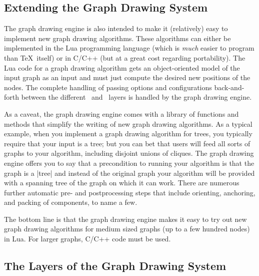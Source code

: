 \subsection{Extending the Graph Drawing System}

The graph drawing engine is also intended to make it (relatively) easy to
implement new graph drawing algorithms. These algorithms can either be
implemented in the Lua programming language (which is \emph{much} easier to
program than \TeX\ itself) or in C/C++ (but at a great cost regarding
portability). The Lua code for a graph drawing algorithm gets an
object-oriented model of the input graph as an input and must just compute the
desired new positions of the nodes. The complete handling of passing options
and configurations back-and-forth between the different \tikzname\ and
\pgfname\ layers is handled by the graph drawing engine.

As a caveat, the graph drawing engine comes with a library of functions and
methods that simplify the writing of new graph drawing algorithms. As a typical
example, when you implement a graph drawing algorithm for trees, you typically
require that your input is a tree; but you can bet that users will feed all
sorts of graphs to your algorithm, including disjoint unions of cliques. The
graph drawing engine offers you to say that a precondition to running your
algorithm is that the graph is a |tree| and instead of the original graph your
algorithm will be provided with a spanning tree of the graph on which it can
work. There are numerous further automatic pre- and postprocessing steps that
include orienting, anchoring, and packing of components, to name a few.

The bottom line is that the graph drawing engine makes it easy
to try out new graph drawing algorithms for medium sized graphs (up
to a few hundred nodes) in Lua. For larger graphs, C/C++ code must be
used.


\subsection{The Layers of the Graph Drawing System}
\label{section-gd-layers}

